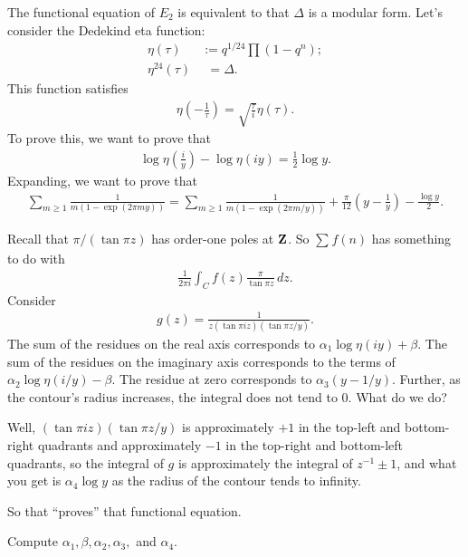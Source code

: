 \documentclass[11pt, oneside,margin=1in]{article}
\begin{document}
The functional equation of $E_2$ is equivalent to that $\Delta$ is a modular form. Let's consider the Dedekind eta function:
\begin{align*}
	\eta(\tau) &:= q^{1/24} \prod  (1-q^n); \\
	\eta^{24}(\tau)&\phantom{:} = \Delta.
\end{align*}
This function satisfies
\begin{align*}
	\eta\left( -\frac{1}{\tau} \right) = \sqrt{\frac{\tau}{i}} \eta (\tau). 
\end{align*}
To prove this, we want to prove that
\begin{align*}
	\log \eta \left( \frac{i}{y} \right) - \log \eta \left( iy \right) = \frac{1}{2}\log y.
\end{align*}
Expanding, we want to prove that
\begin{align*}
	\sum_{m\ge 1}^{} \frac{1}{m(1-\exp(2\pi my))} = \sum_{m\ge 1}^{} \frac{1}{m(1-\exp(2\pi m/y))} + \frac{\pi}{12} \left(y - \frac{1}{y} \right) - \frac{\log y}{2}.
\end{align*}

Recall that $\pi/(\tan \pi z)$ has order-one poles at $\mathbf Z$. So $\sum_{}^{} f(n)$ has something to do with 
\begin{align*}
	\frac{1}{2\pi i} \int_{C}^{} f(z) \frac{\pi}{\tan \pi z} \, dz. 
\end{align*}
Consider 
\begin{align*}
	g(z) =  \frac{1}{z(\tan \pi i z) (\tan \pi z/y)}.
\end{align*}
The sum of the residues on the real axis corresponds to $\alpha_1\log \eta(iy) + \beta$. The sum of the residues on the imaginary axis corresponds to the terms of $\alpha_2 \log \eta(i/y) - \beta$. The residue at zero corresponds to $\alpha_3(y - 1/y)$. Further, as the contour's radius increases, the integral does not tend to $0$. What do we do?

Well, $(\tan \pi i z)(\tan \pi z/y)$ is approximately $+1$ in the top-left and bottom-right quadrants and approximately $-1$ in the top-right and bottom-left quadrants, so the integral of $g$ is approximately the integral of $z^{-1} \pm 1$, and what you get is $\alpha_4\log y$ as the radius of the contour tends to infinity.

So that ``proves'' that functional equation.

\begin{exercise}\label{}\text{}
Compute $\alpha_1,\beta,\alpha_2,\alpha_3,$ and $\alpha_4$.
\end{exercise}
\end{document}
